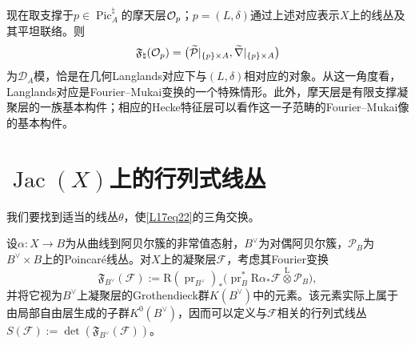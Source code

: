 现在取支撑于$p\in\operatorname{Pic}_A^\natural$的摩天层$\mathcal O_p$；$p=(L,\delta)$通过上述对应表示$X$上的线丛及其平坦联络。则
\[\mathfrak F_\natural(\mathcal O_p)=\bigl(\widetilde{\mathcal P}|_{\{p\}\times A},\widetilde\nabla|_{\{p\}\times A}\bigr)\]
为$\mathcal D_A$模，恰是在几何Langlands对应下与$(L,\delta)$相对应的对象。从这一角度看，Langlands对应是Fourier--Mukai变换的一个特殊情形。此外，摩天层是有限支撑凝聚层的一族基本构件；相应的Hecke特征层可以看作这一子范畴的Fourier--Mukai像的基本构件。
\section{\texorpdfstring{$\operatorname{Jac}(X)$上的行列式线丛}{Jac(X)上的行列式线丛}}\label{L17S3}
我们要找到适当的线丛$\theta$，使\eqref{L17eq22}的三角交换。

设$\alpha:X\to B$为从曲线到阿贝尔簇的非常值态射，$B^\vee$为对偶阿贝尔簇，$\mathcal P_B$为$B^\vee\times B$上的Poincaré线丛。对$X$上的凝聚层$\mathcal F$，考虑其Fourier变换
\[\mathfrak F_{B^\vee}(\mathcal F):=\mathrm R(\operatorname{pr}_{B^\vee})_*\bigl(\operatorname{pr}_B^*\mathrm R\alpha_*\mathcal F\overset{\mathrm L}{\otimes}\mathcal P_B\bigr),\]
并将它视为$B^\vee$上凝聚层的Grothendieck群$K(B^\vee)$中的元素。该元素实际上属于由局部自由层生成的子群$K^0(B^\vee)$，因而可以定义与$\mathcal F$相关的行列式线丛$S(\mathcal F):=\det(\mathfrak F_{B^\vee}(\mathcal F))$。

